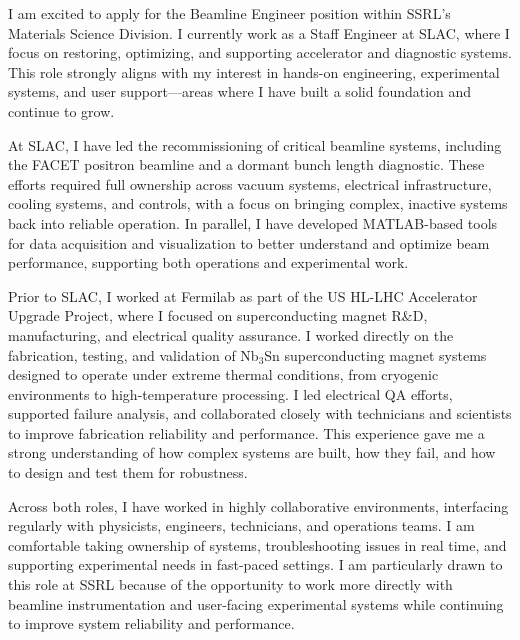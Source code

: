 \documentclass[11pt, a4paper]{awesome-cv} %
\begin{document}
\makecvheader %

\makelettertitle %


\begin{cvletter}





{\setlength{\parindent}{1.5em}
I am excited to apply for the Beamline Engineer position within SSRL’s Materials Science Division. I currently work as a Staff Engineer at SLAC, where I focus on restoring, optimizing, and supporting accelerator and diagnostic systems. This role strongly aligns with my interest in hands-on engineering, experimental systems, and user support—areas where I have built a solid foundation and continue to grow.

At SLAC, I have led the recommissioning of critical beamline systems, including the FACET positron beamline and a dormant bunch length diagnostic. These efforts required full ownership across vacuum systems, electrical infrastructure, cooling systems, and controls, with a focus on bringing complex, inactive systems back into reliable operation. In parallel, I have developed MATLAB-based tools for data acquisition and visualization to better understand and optimize beam performance, supporting both operations and experimental work.

Prior to SLAC, I worked at Fermilab as part of the US HL-LHC Accelerator Upgrade Project, where I focused on superconducting magnet R\&D, manufacturing, and electrical quality assurance. I worked directly on the fabrication, testing, and validation of Nb$_3$Sn superconducting magnet systems designed to operate under extreme thermal conditions, from cryogenic environments to high-temperature processing. I led electrical QA efforts, supported failure analysis, and collaborated closely with technicians and scientists to improve fabrication reliability and performance. This experience gave me a strong understanding of how complex systems are built, how they fail, and how to design and test them for robustness.
}

{\setlength{\parindent}{1.5em}
Across both roles, I have worked in highly collaborative environments, interfacing regularly with physicists, engineers, technicians, and operations teams. I am comfortable taking ownership of systems, troubleshooting issues in real time, and supporting experimental needs in fast-paced settings. I am particularly drawn to this role at SSRL because of the opportunity to work more directly with beamline instrumentation and user-facing experimental systems while continuing to improve system reliability and performance.

}
\end{cvletter}
\end{document}
